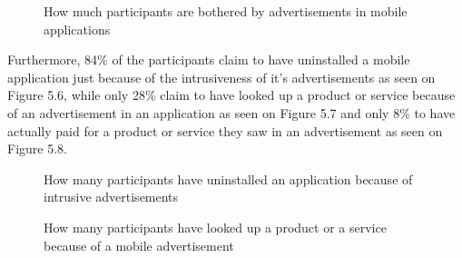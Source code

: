 \begin{figure}
\begin{center}
\caption{How much participants are bothered by advertisements in mobile applications}
\end{center}
\end{figure}

Furthermore, 84\% of the participants claim to have uninstalled a mobile application just because of the intrusiveness of it's advertisements as seen on Figure 5.6, while only 28\% claim to have looked up a product or service because of an advertisement in an application as seen on Figure 5.7 and only 8\% to have actually paid for a product or service they saw in an advertisement as seen on Figure 5.8.

\begin{figure}
\begin{center}
\caption{How many participants have uninstalled an application because of intrusive advertisements}
\end{center}
\end{figure}

\begin{figure}
\begin{center}
\caption{How many participants have looked up a product or a service because of a mobile advertisement}
\end{center}
\end{figure}

